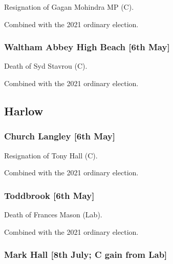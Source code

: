\documentclass[a4paper,openany]{book}
\begin{document}
\begin{resultsiii}

Resignation of Gagan Mohindra MP (C).

Combined with the 2021 ordinary election.

\subsubsection*{Waltham Abbey High Beach \hspace*{\fill}\nolinebreak[1]%
	\enspace\hspace*{\fill}
	[6th May]}


Death of Syd Stavrou (C).

Combined with the 2021 ordinary election.

\subsection*{Harlow}

\subsubsection*{Church Langley \hspace*{\fill}\nolinebreak[1]%
	\enspace\hspace*{\fill}
	[6th May]}


Resignation of Tony Hall (C).

Combined with the 2021 ordinary election.

\subsubsection*{Toddbrook \hspace*{\fill}\nolinebreak[1]%
	\enspace\hspace*{\fill}
	[6th May]}


Death of Frances Mason (Lab).

Combined with the 2021 ordinary election.

\subsubsection*{Mark Hall \hspace*{\fill}\nolinebreak[1]%
	\enspace\hspace*{\fill}
	[8th July; C gain from Lab]}


\end{resultsiii}
\end{document}
